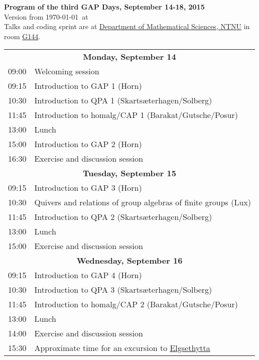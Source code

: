 \documentclass[12pt,a4paper]{article}
\begin{document}
\begin{center}
{\huge\textbf{Program of the third GAP Days, September 14-18, 2015}\\[2mm]}
Version from \today\ at \currenttime\\[2mm]
Talks and coding sprint are at
\href{http://www.ntnu.edu/imf)}{Department of Mathematical Sciences,
  NTNU} in room \href{http://s.mazemap.com/1RvAr1E}{G144}.
\end{center}

\newcommand{\talk}[3]{#1 & #2 \\ & \textit{#3} \\}

\newcommand{\newday}[1]{\multicolumn{2}{c}{{\large\textbf{#1}}} \\[1em]}


\begin{tabular}{rp{14.5cm}}
%
\newday{Monday, September 14}
09:00 & Welcoming session \\
09:15 & Introduction to GAP 1 (Horn)\\
10:30 & Introduction to QPA 1 (Skarts\ae terhagen/Solberg)\\
11:45 & Introduction to homalg/CAP 1 (Barakat/Gutsche/Posur)\\
13:00 & Lunch \\
15:00 & Introduction to GAP 2 (Horn)\\
16:30 & Exercise and discussion session

%
%
\\
%
%
\newday{Tuesday, September 15}
09:15 & Introduction to GAP 3 (Horn)\\
10:30 & Quivers and relations of group algebras of finite groups (Lux) \\
11:45 & Introduction to QPA 2 (Skarts\ae terhagen/Solberg)\\
13:00 & Lunch \\
15:00 & Exercise and discussion session

%
%
\\
%
%
\newday{Wednesday, September 16}
09:15 & Introduction to GAP 4 (Horn)\\
10:30 & Introduction to QPA 3 (Skarts\ae terhagen/Solberg)\\
11:45 & Introduction to homalg/CAP 2 (Barakat/Gutsche/Posur)\\
13:00 & Lunch \\
14:00 & Exercise and discussion session \\
15:30 & Approximate time for an excursion to
\href{http://www.elgsethytta.com/public.aspx?pageid=88995}{Elgsethytta}
\end{tabular}
\end{document}
